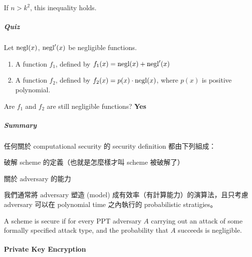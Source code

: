 If \(n > k^2\), this inequality holds.

\subparagraph{Quiz}

Let \(\operatorname{negl}(x)\), \(\operatorname{negl}'(x)\) be negligible functions. \\
\begin{enumerate}
	\item A function \(f_1\), defined by \(f_1(x) = \operatorname{negl}(x) + \operatorname{negl}'(x)\)
	\item A function \(f_2\), defined by \(f_2(x) = p(x) \cdot \operatorname{negl}(x)\), where \(p(x)\) is positive polynomial.
\end{enumerate}

Are \(f_1\) and \(f_2\) are still negligible functions? \textbf{Yes}

\subparagraph{Summary}

任何關於 computational security 的 security definition 都由下列組成：
\begin{myEnumerate}
	\item 破解 scheme 的定義（也就是怎麼樣才叫 scheme 被破解了）
	\item 關於 adversary 的能力
\end{myEnumerate}

我們通常將 adversary 塑造 (model) 成有效率（有計算能力）的演算法，且只考慮 adversary 可以在 polynomial time 之內執行的 probabilistic stratigies。

\begin{definition}
	A scheme is secure if for every PPT adversary \(A\) carrying out an attack of some formally specified attack type, and the probability that \(A\) succeeds is negligible.
\end{definition}


\paragraph{Private Key Encryption}


